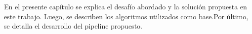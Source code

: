 




En el presente capítulo se explica el desafío abordado y la solución propuesta en este trabajo. Luego, se describen los algoritmos utilizados como base.Por último, se detalla el desarrollo del pipeline propuesto.



	

